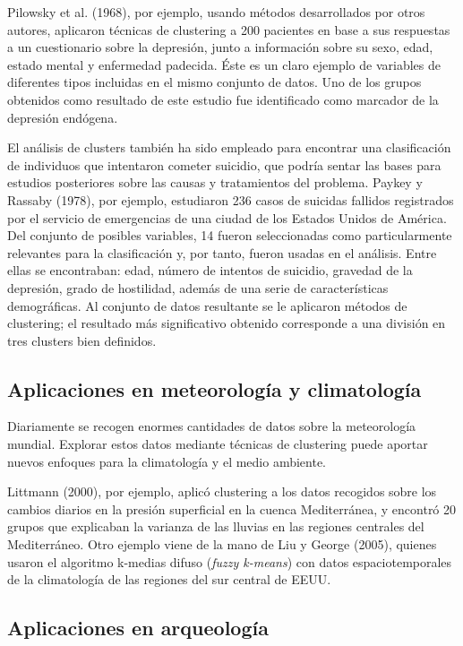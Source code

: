 Pilowsky et al. (1968), por ejemplo, usando métodos desarrollados por otros autores, aplicaron técnicas de clustering a 200 pacientes en base a sus respuestas a un cuestionario sobre la depresión, junto a información sobre su sexo, edad, estado mental y enfermedad padecida. Éste es un claro ejemplo de variables de diferentes tipos incluidas en el mismo conjunto de datos. Uno de los grupos obtenidos como resultado de este estudio fue identificado como marcador de la depresión endógena.

El análisis de clusters también ha sido empleado para encontrar una clasificación de individuos que intentaron cometer suicidio, que podría sentar las bases para estudios posteriores sobre las causas y tratamientos del problema. Paykey y Rassaby (1978), por ejemplo, estudiaron 236 casos de suicidas fallidos registrados por el servicio de emergencias de una ciudad de los Estados Unidos de América. Del conjunto de posibles variables, 14 fueron seleccionadas como particularmente relevantes para la clasificación y, por tanto, fueron usadas en el análisis. Entre ellas se encontraban: edad, número de intentos de suicidio, gravedad de la depresión, grado de hostilidad, además de una serie de características demográficas. Al conjunto de datos resultante se le aplicaron métodos de clustering; el resultado más significativo obtenido corresponde a una división en tres clusters bien definidos.

\subsection{Aplicaciones en meteorología y climatología}

Diariamente se recogen enormes cantidades de datos sobre la meteorología mundial. Explorar estos datos mediante técnicas de clustering puede aportar nuevos enfoques para la climatología y el medio ambiente.

Littmann (2000), por ejemplo, aplicó clustering a los datos recogidos sobre los cambios diarios en la presión superficial en la cuenca Mediterránea, y encontró 20 grupos que explicaban la varianza de las lluvias en las regiones centrales del Mediterráneo. Otro ejemplo viene de la mano de Liu y George (2005), quienes usaron el algoritmo k-medias difuso (\textit{fuzzy k-means}) con datos espaciotemporales de la climatología de las regiones del sur central de EEUU. 

\subsection{Aplicaciones en arqueología}

